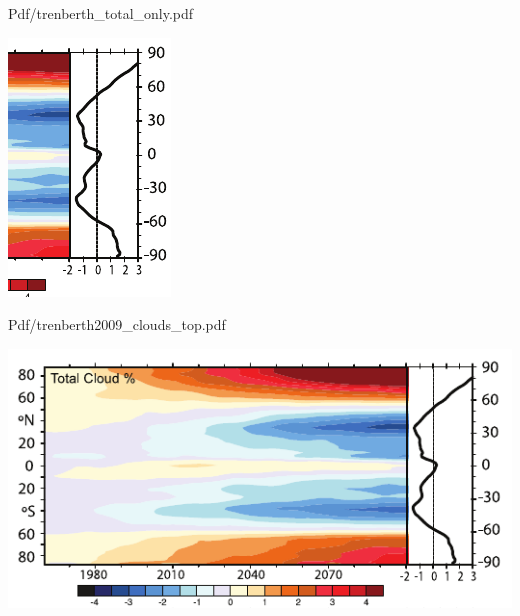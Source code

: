 \documentclass[presentation]{beamer}
\begin{document}
\begin{frame}[label={sec:orgdf24683}]{Pdf/trenberth\_total\_only.pdf}
\begin{center}
\includegraphics[width=0.7\linewidth]{./Figs/Pdf/trenberth_total_only.pdf}
\end{center}
\end{frame}

\begin{frame}[label={sec:orge689bc7}]{Pdf/trenberth2009\_clouds\_top.pdf}
\begin{center}
\includegraphics[width=0.7\linewidth]{./Figs/Pdf/trenberth2009_clouds_top.pdf}
\end{center}
\end{frame}
\end{document}
